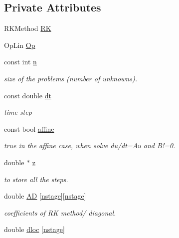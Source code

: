 \subsection*{Private Attributes}
\begin{DoxyCompactItemize}
\item 
R\-K\-Method \hyperlink{classodes_1_1Sdirkl_a9dd62d6ca502cee8b06adc8b9de59fb6}{R\-K}
\item 
Op\-Lin \hyperlink{classodes_1_1Sdirkl_a9e090146baaa9e9e3ffabc92a07c101e}{Op}
\item 
const int \hyperlink{classodes_1_1Sdirkl_a46a12e099af780050593f428c86c91c4}{n}
\begin{DoxyCompactList}\small\item\em size of the problems (number of unknowns). \end{DoxyCompactList}\item 
const double \hyperlink{classodes_1_1Sdirkl_a88089e61856ee563fb7d0797e86b2050}{dt}
\begin{DoxyCompactList}\small\item\em time step \end{DoxyCompactList}\item 
const bool \hyperlink{classodes_1_1Sdirkl_a5df4ba68985fd2ea2dee4f3b16b5618a}{affine}
\begin{DoxyCompactList}\small\item\em true in the affine case, when solve du/dt=Au and B!=0. \end{DoxyCompactList}\item 
double $\ast$ \hyperlink{classodes_1_1Sdirkl_aa4de1776bba3e4dce817fc7fdb6067ac}{z}
\begin{DoxyCompactList}\small\item\em to store all the steps. \end{DoxyCompactList}\item 
double \hyperlink{classodes_1_1Sdirkl_aba0e7979871b61edd3f7c9da4e7ed02f}{A\-D} \mbox{[}\hyperlink{classodes_1_1Sdirkl_add32e0557722940c648c1c7aa147effd}{nstage}\mbox{]}\mbox{[}\hyperlink{classodes_1_1Sdirkl_add32e0557722940c648c1c7aa147effd}{nstage}\mbox{]}
\begin{DoxyCompactList}\small\item\em coefficients of R\-K method/ diagonal. \end{DoxyCompactList}\item 
double \hyperlink{classodes_1_1Sdirkl_a61a9061512e260099a88f0531377a531}{dloc} \mbox{[}\hyperlink{classodes_1_1Sdirkl_add32e0557722940c648c1c7aa147effd}{nstage}\mbox{]}

\end{DoxyCompactItemize}
